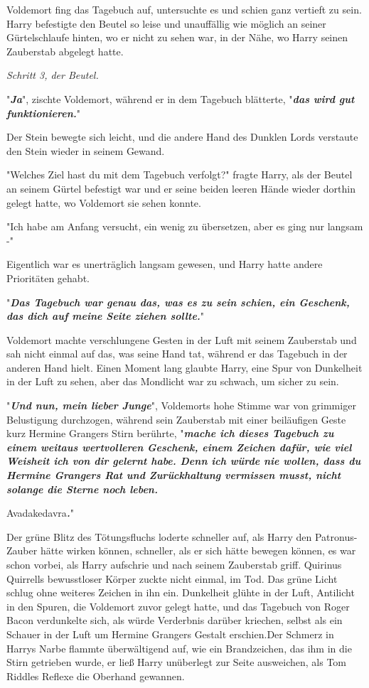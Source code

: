 {Voldemort fing das Tagebuch auf, untersuchte es und schien ganz vertieft zu sein. Harry befestigte den Beutel so leise und unauffällig wie möglich an seiner Gürtelschlaufe hinten, wo er nicht zu sehen war, in der Nähe, wo Harry seinen Zauberstab abgelegt hatte.

\emph{Schritt 3, der Beutel.}

"\textbf{\emph{Ja}}", zischte Voldemort, während er in dem Tagebuch blätterte, "\textbf{\emph{das wird gut funktionieren.}}"

Der Stein bewegte sich leicht, und die andere Hand des Dunklen Lords verstaute den Stein wieder in seinem Gewand.

"Welches Ziel hast du mit dem Tagebuch verfolgt?" fragte Harry, als der Beutel an seinem Gürtel befestigt war und er seine beiden leeren Hände wieder dorthin gelegt hatte, wo Voldemort sie sehen konnte.

"Ich habe am Anfang versucht, ein wenig zu übersetzen, aber es ging nur langsam -"

Eigentlich war es unerträglich langsam gewesen, und Harry hatte andere Prioritäten gehabt.

"\textbf{\emph{Das Tagebuch war genau das, was es zu sein schien, ein Geschenk, das dich auf meine Seite ziehen sollte.}}"

Voldemort machte verschlungene Gesten in der Luft mit seinem Zauberstab und sah nicht einmal auf das, was seine Hand tat, während er das Tagebuch in der anderen Hand hielt. Einen Moment lang glaubte Harry, eine Spur von Dunkelheit in der Luft zu sehen, aber das Mondlicht war zu schwach, um sicher zu sein.

"\textbf{\emph{Und nun, mein lieber Junge}}", Voldemorts hohe Stimme war von grimmiger Belustigung durchzogen, während sein Zauberstab mit einer beiläufigen Geste kurz Hermine Grangers Stirn berührte, "\textbf{\emph{mache ich dieses Tagebuch zu einem weitaus wertvolleren Geschenk, einem Zeichen dafür, wie viel Weisheit ich von dir gelernt habe. Denn ich würde nie wollen, dass du Hermine Grangers Rat und Zurückhaltung vermissen musst, nicht solange die Sterne noch leben.}}

Avadakedavra\textbf{\emph{.}}"

Der grüne Blitz des Tötungsfluchs loderte schneller auf, als Harry den Patronus-Zauber hätte wirken können, schneller, als er sich hätte bewegen können, es war schon vorbei, als Harry aufschrie und nach seinem Zauberstab griff. Quirinus Quirrells bewusstloser Körper zuckte nicht einmal, im Tod. Das grüne Licht schlug ohne weiteres Zeichen in ihn ein. Dunkelheit glühte in der Luft, Antilicht in den Spuren, die Voldemort zuvor gelegt hatte, und das Tagebuch von Roger Bacon verdunkelte sich, als würde Verderbnis darüber kriechen, selbst als ein Schauer in der Luft um Hermine Grangers Gestalt erschien.Der Schmerz in Harrys Narbe flammte überwältigend auf, wie ein Brandzeichen, das ihm in die Stirn getrieben wurde, er ließ Harry unüberlegt zur Seite ausweichen, als Tom Riddles Reflexe die Oberhand gewannen.

}
